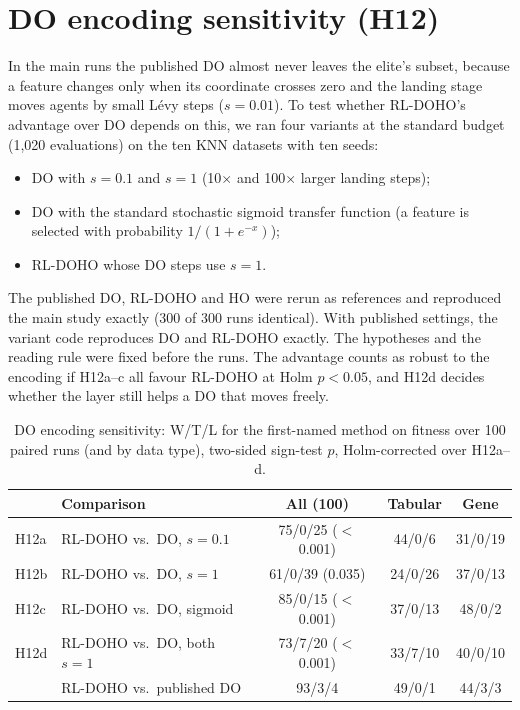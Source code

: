 \documentclass[journal]{IEEEtran}
\begin{document}
\section{DO encoding sensitivity (H12)}
In the main runs the published DO almost never leaves the elite's subset, because a feature changes only when its coordinate crosses zero and the landing stage moves agents by small L\'evy steps ($s=0.01$). To test whether RL-DOHO's advantage over DO depends on this, we ran four variants at the standard budget (1,020 evaluations) on the ten KNN datasets with ten seeds:
\begin{itemize}
\item DO with $s=0.1$ and $s=1$ (10$\times$ and 100$\times$ larger landing steps);
\item DO with the standard stochastic sigmoid transfer function (a feature is selected with probability $1/(1+e^{-x})$);
\item RL-DOHO whose DO steps use $s=1$.
\end{itemize}
The published DO, RL-DOHO and HO were rerun as references and reproduced the main study exactly (300 of 300 runs identical). With published settings, the variant code reproduces DO and RL-DOHO exactly. The hypotheses and the reading rule were fixed before the runs. The advantage counts as robust to the encoding if H12a--c all favour RL-DOHO at Holm $p<0.05$, and H12d decides whether the layer still helps a DO that moves freely.

\begin{table}[h]
\centering
\caption{DO encoding sensitivity: W/T/L for the first-named method on fitness over 100 paired runs (and by data type), two-sided sign-test $p$, Holm-corrected over H12a--d.}
\label{tab:h12}
\footnotesize
\setlength{\tabcolsep}{2.5pt}
\begin{tabular}{@{}llccc@{}}
\toprule
& Comparison & All (100) & Tabular & Gene \\
\midrule
H12a & RL-DOHO vs.\ DO, $s=0.1$ & 75/0/25 ($<$0.001) & 44/0/6 & 31/0/19 \\
H12b & RL-DOHO vs.\ DO, $s=1$ & 61/0/39 (0.035) & 24/0/26 & 37/0/13 \\
H12c & RL-DOHO vs.\ DO, sigmoid & 85/0/15 ($<$0.001) & 37/0/13 & 48/0/2 \\
H12d & RL-DOHO vs.\ DO, both $s=1$ & 73/7/20 ($<$0.001) & 33/7/10 & 40/0/10 \\
\midrule
 & RL-DOHO vs.\ published DO & 93/3/4 & 49/0/1 & 44/3/3 \\
\bottomrule
\end{tabular}
\end{table}
\end{document}
